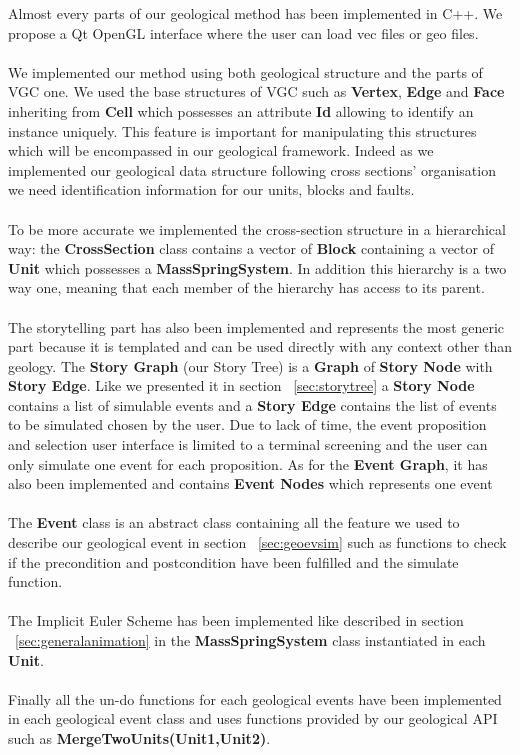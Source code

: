 \documentclass[12pt, a4paper]{report} %
\begin{document}
Almost every parts of our geological method has been implemented in C++. We propose a Qt OpenGL interface where the user can load vec files or geo files.\\\\
We implemented our method using both geological structure and the parts of VGC one. We used the base structures of VGC such as \textbf{Vertex}, \textbf{Edge} and \textbf{Face} inheriting from \textbf{Cell} which possesses an attribute \textbf{Id} allowing to identify an instance uniquely. This feature is important for manipulating this structures which will be encompassed in our geological framework. Indeed as we implemented our geological data structure following cross sections' organisation we need identification information for our units, blocks and faults.\\\\
To be more accurate we implemented the cross-section structure in a hierarchical way: the \textbf{CrossSection} class contains a vector of \textbf{Block} containing a vector of \textbf{Unit} which possesses a \textbf{MassSpringSystem}. In addition this hierarchy is a two way one, meaning that each member of the hierarchy has access to its parent.\\\\
The storytelling part has also been implemented and represents the most generic part because it is templated and can be used directly with any context other than geology. The \textbf{Story Graph} (our Story Tree) is a \textbf{Graph} of \textbf{Story Node} with \textbf{Story Edge}. Like we presented it in section ~\ref{sec:storytree} a \textbf{Story Node} contains a list of simulable events and a \textbf{Story Edge} contains the list of events to be simulated chosen by the user.
Due to lack of time, the event proposition and selection user interface is limited to a terminal screening and the user can only simulate one event for each proposition. As for the \textbf{Event Graph}, it has also been implemented and contains \textbf{Event Nodes} which represents one event\\\\
The \textbf{Event} class is an abstract class containing all the feature we used to describe our geological event in section ~\ref{sec:geoevsim} such as functions to check if the precondition and postcondition have been fulfilled and the simulate function.\\\\
The Implicit Euler Scheme has been implemented like described in section ~\ref{sec:generalanimation} in the \textbf{MassSpringSystem} class instantiated in each \textbf{Unit}.\\\\
Finally all the un-do functions for each geological events have been implemented in each geological event class and uses functions provided by our geological API such as \textbf{MergeTwoUnits(Unit1,Unit2)}. 
\end{document}
